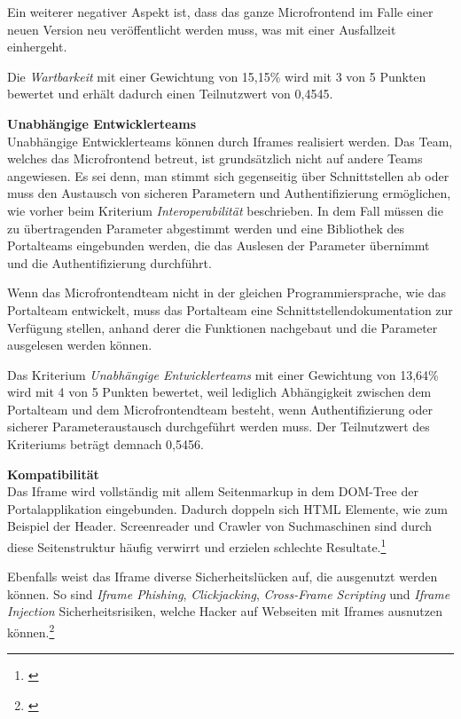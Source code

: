 Ein weiterer negativer Aspekt ist, dass das ganze Microfrontend im Falle einer neuen Version neu veröffentlicht werden muss, was mit einer Ausfallzeit einhergeht.

Die \textit{Wartbarkeit} mit einer Gewichtung von 15,15\% wird mit 3 von 5 Punkten bewertet und erhält dadurch einen Teilnutzwert von 0,4545.

\textbf{Unabhängige Entwicklerteams}\\
Unabhängige Entwicklerteams können durch Iframes realisiert werden. Das Team, welches das Microfrontend betreut, ist grundsätzlich nicht auf andere Teams angewiesen. Es sei denn, man stimmt sich gegenseitig über Schnittstellen ab oder muss den Austausch von sicheren Parametern und Authentifizierung ermöglichen, wie vorher beim Kriterium \textit{Interoperabilität} beschrieben. In dem Fall müssen die zu übertragenden Parameter abgestimmt werden und eine Bibliothek des Portalteams eingebunden werden, die das Auslesen der Parameter übernimmt und die Authentifizierung durchführt.

Wenn das Microfrontendteam nicht in der gleichen Programmiersprache, wie das Portalteam entwickelt, muss das Portalteam eine Schnittstellendokumentation zur Verfügung stellen, anhand derer die Funktionen nachgebaut und die Parameter ausgelesen werden können.

Das Kriterium \textit{Unabhängige Entwicklerteams} mit einer Gewichtung von 13,64\% wird mit 4 von 5 Punkten bewertet, weil lediglich Abhängigkeit zwischen dem Portalteam und dem Microfrontendteam besteht, wenn Authentifizierung oder sicherer Parameteraustausch durchgeführt werden muss. Der Teilnutzwert des Kriteriums beträgt demnach 0,5456.

\textbf{Kompatibilität}\\
Das Iframe wird vollständig mit allem Seitenmarkup in dem \gls{DOM}-Tree der Portalapplikation eingebunden. Dadurch doppeln sich \gls{HTML} Elemente, wie zum Beispiel der Header. Screenreader und Crawler von Suchmaschinen sind durch diese Seitenstruktur häufig verwirrt und erzielen schlechte Resultate.\footnote{\cite[vgl.][]{GoogleSearchCentral2022}}

Ebenfalls weist das Iframe diverse Sicherheitslücken auf, die ausgenutzt werden können. So sind \textit{Iframe Phishing}, \textit{Clickjacking}, \textit{Cross-Frame Scripting} und \textit{Iframe Injection} Sicherheitsrisiken, welche Hacker auf Webseiten mit Iframes ausnutzen können.\footnote{\cite[vgl.][]{Gunawardhana2021}}

